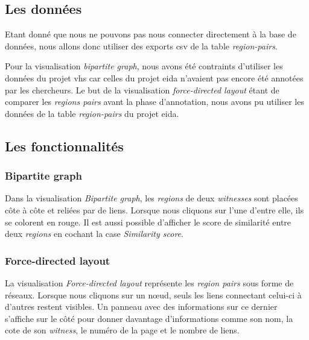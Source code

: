 \subsection{Les données}

Etant donné que nous ne pouvons pas nous connecter directement à la base de données, nous allons donc utiliser des exports \gls{csv} de la table \textit{region-pairs}.

Pour la visualisation \textit{bipartite graph}, nous avons été contraints d'utiliser les données du projet \gls{vhs} car celles du projet \gls{eida} n'avaient pas encore été annotées par les chercheurs. Le but de la visualisation \textit{force-directed layout} étant de comparer les \textit{regions pairs} avant la phase d'annotation, nous avons pu utiliser les données de la table \textit{region-pairs} du projet \gls{eida}.

\subsection{Les fonctionnalités}

\subsubsection{Bipartite graph}

Dans la visualisation \textit{Bipartite graph}, les \textit{regions} de deux \textit{witnesses} sont placées côte à côte et reliées par de liens. Lorsque nous cliquons sur l'une d'entre elle, ils se colorent en rouge. Il est aussi possible d'afficher le score de similarité entre deux \textit{regions} en cochant la case \textit{Similarity score}. 

\subsubsection{Force-directed layout}

La visualisation \textit{Force-directed layout} représente les \textit{region pairs} sous forme de réseaux. Lorsque nous cliquons sur un nœud, seuls les liens connectant celui-ci à d'autres restent visibles. Un panneau avec des informations sur ce dernier s'affiche sur le côté pour donner davantage d'informations comme son nom, la cote de son \textit{witness}, le numéro de la page et le nombre de liens. \\